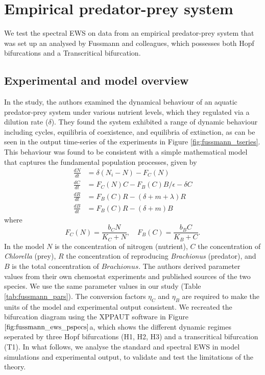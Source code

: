 \documentclass[10pt]{article}
\date{}
\begin{document}
\section{Empirical predator-prey system}

We test the spectral EWS on data from an empirical predator-prey system that was set up an analysed by Fussmann and colleagues\cite{fussmann00}, which possesses both Hopf bifurcations and a Transcritical bifurcation.

\subsection{Experimental and model overview}

In the study, the authors examined the dynamical behaviour of an aquatic predator-prey system under various nutrient levels, which they regulated via a dilution rate ($\delta$). They found the system exhibited a range of dynamic behaviour including cycles, equilibria of coexistence, and equilibria of extinction, as can be seen in the output time-series of the experiments in Figure \ref{fig:fussmann_tseries}. This behaviour was found to be consistent with a simple mathematical model that captures the fundamental population processes, given by
\begin{align}
    \frac{dN}{dt} & = \delta(N_i - N) - F_C(N) \label{eq:pp1}\\
    \frac{dC}{dt} & = F_C(N) C - F_B(C) B/\epsilon - \delta C \label{eq:pp2}\\
    \frac{dR}{dt} & = F_B(C) R - (\delta + m + \lambda) R \label{eq:pp3}\\
    \frac{dB}{dt} & = F_B(C) R - (\delta + m) B \label{eq:pp4}
\end{align}
where
\begin{equation}
    F_C(N)= \frac{b_C N}{K_C + N}, \quad F_B(C) = \frac{b_B C}{K_B + C}.
\end{equation}
In the model $N$ is the concentration of nitrogen (nutrient), $C$ the concentration of \textit{Chlorella} (prey), $R$ the concentration of reproducing \textit{Brachionus} (predator), and $B$ is the total concentration of $\textit{Brachionus}$. The authors derived parameter values from their own chemostat experiments and published sources of the two species. We use the same parameter values in our study (Table \ref{tab:fussmann_pars}). The conversion factors $\eta_C$ and $\eta_B$ are required to make the units of the model and experimental output consistent. We recreated the bifurcation diagram using the XPPAUT software\cite{ermentrout02} in Figure $\ref{fig:fussmann_ews_pspecs}$a, which shows the different dynamic regimes seperated by three Hopf bifurcations (H1, H2, H3) and a transcritical bifurcation (T1). In what follows, we analyse the standard and spectral EWS in model simulations and experimental output, to validate and test the limitations of the theory.
\end{document}
